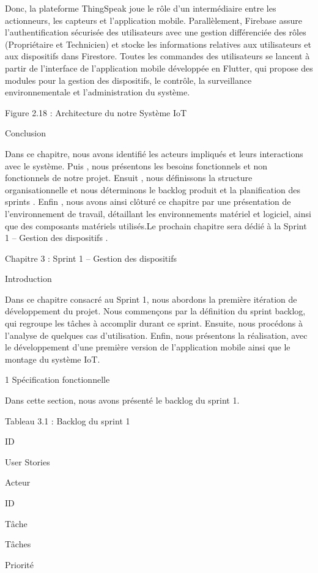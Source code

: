 \documentclass{article}
\begin{document}
Donc, la plateforme ThingSpeak joue le rôle d'un intermédiaire entre les actionneurs, les capteurs et l'application mobile. Parallèlement, Firebase assure l'authentification sécurisée des utilisateurs avec une gestion différenciée des rôles (Propriétaire et Technicien) et stocke les informations relatives aux utilisateurs et aux dispositifs dans Firestore. Toutes les commandes des utilisateurs se lancent à partir de l'interface de l'application mobile développée en Flutter, qui propose des modules pour la gestion des dispositifs, le contrôle, la surveillance environnementale et l'administration du système.

Figure 2.18 : Architecture du notre Système IoT 

Conclusion

Dans ce chapitre, nous avons identifié  les acteurs impliqués et leurs interactions avec le système. Puis , nous présentons les besoins fonctionnels et non fonctionnels de notre projet. Ensuit , nous définissons la structure organisationnelle et nous déterminons le backlog produit et la planification des sprints  . Enfin , nous avons ainsi clôturé ce chapitre par une présentation de l'environnement de travail, détaillant  les  environnements  matériel et logiciel, ainsi que des composants matériels utilisés.Le prochain chapitre sera dédié à la Sprint 1 – Gestion  des dispositifs .

Chapitre 3 : Sprint 1 – Gestion  des dispositifs 

Introduction 

Dans ce chapitre consacré au Sprint 1, nous abordons la première itération de développement du projet. Nous commençons par la définition du sprint backlog, qui regroupe les tâches à accomplir durant ce sprint. Ensuite, nous procédons à l’analyse de quelques cas d’utilisation. Enfin, nous présentons la réalisation, avec le développement d’une première version de l’application mobile ainsi que le montage du système IoT.

1 Spécification fonctionnelle

Dans cette section, nous avons  présenté le backlog du sprint 1.

Tableau 3.1 : Backlog du sprint 1

ID

User Stories

Acteur

ID

Tâche

Tâches

Priorité
\end{document}
